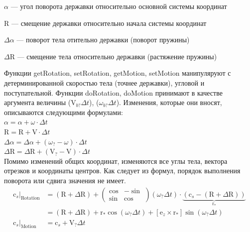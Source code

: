 \documentclass[14pt]{extreport}
\newcommand{\br}[1]{\boldsymbol{\mathrm{#1}}}
\renewcommand{\vec}[1]{\br{#1}}
\newenvironment{packed_itemize}{
\begin{itemize}
  \setlength{\itemsep}{1pt}
  \setlength{\parskip}{0pt}
  \setlength{\parsep}{0pt}
}{\end{itemize}}
\begin{document}
\begin{packed_itemize}
\item $\alpha$ --- угол поворота державки относительно основной системы координат
\item $\vec R$ --- смещение державки относительно начала системы координат
\item $\Delta \alpha$ --- поворот тела отительно державки (поворот пружины)
\item $\Delta \vec R$ --- смещение тела относительно державки (растяжение пружины)
\end{packed_itemize}

Функции getRotation, setRotation, getMotion, setMotion манипуляруют с детерминированной скоростью тела (точнее державки), угловой и поступательной.
Функции doRotation, doMotion принимают в качестве аргумента величины ($\vec V_{b?} \Delta t$), ($\omega_{b?} \Delta t$). Изменения, которые они вносят, описываются следующими формулами:\\
$\alpha = \alpha + \omega \cdot \Delta t$\\
$\vec R = \vec R + \vec V \cdot \Delta t$\\
$\Delta \alpha = \Delta \alpha + (\omega_{?} - \omega) \cdot \Delta t$\\
$\Delta \vec R = \Delta \vec R + (\vec V_{?} - \vec V) \cdot \Delta t$\\

Помимо изменений общих координат, изменяются все углы тела, вектора отрезков и координаты центров. Как следует из формул, порядок выполнения поворота или сдвига значения не имеет.
\begin{equation*}
\begin{split}
\vec c_s \vert_\text{Rotation}
& = (\vec R + \Delta \vec R) +
\begin{pmatrix}
\cos & -\sin \\ \sin & \cos
\end{pmatrix}
(\omega_? \Delta t) \cdot \underbrace{(\vec c_s - (\vec R + \Delta \vec R))}_{\vec r_*}\\
& = (\vec R + \Delta \vec R) + \vec r_* \cos(\omega_? \Delta t) + [\vec e_z \times \vec r_*] \sin(\omega_? \Delta t)
\\ \vec c_s \vert_\text{Motion} &= \vec c_s + \vec V_? \Delta t
\end{split}
\end{equation*}
\end{document}
